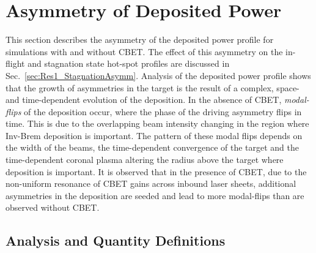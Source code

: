 \section{Asymmetry of Deposited Power}%
\label{sec:Res1_PdepR_CBET_asymm}

This section describes the asymmetry of the deposited power profile for simulations with and without \ac{CBET}.
The effect of this asymmetry on the in-flight and stagnation state hot-spot profiles are discussed in Sec.~\ref{sec:Res1_StagnationAsymm}.
Analysis of the deposited power profile shows that the growth of asymmetries in the target is the result of a complex, space- and time-dependent evolution of the deposition.
In the absence of \ac{CBET}, \textit{modal-flips} of the deposition occur, where the phase of the driving asymmetry flips in time.
This is due to the overlapping beam intensity changing in the region where \ac{Inv-Brem} deposition is important.
The pattern of these modal flips depends on the width of the beams, the time-dependent convergence of the target and the time-dependent coronal plasma altering the radius above the target where deposition is important.
It is observed that in the presence of \ac{CBET}, due to the non-uniform resonance of \ac{CBET} gains across inbound laser sheets, additional asymmetries in the deposition are seeded and lead to more modal-flips than are observed without \ac{CBET}.

\subsection{Analysis and Quantity Definitions}%
\label{sec:Res1_analysis_and_def}

